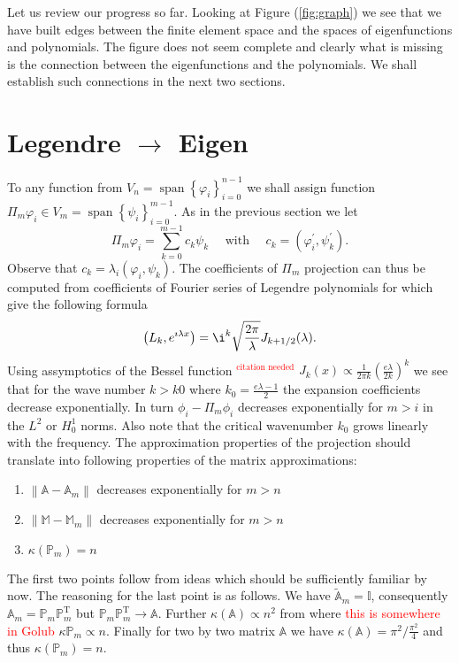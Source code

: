 \documentclass[a4paper,10pt]{article}
\newcommand{\norm}[1]{\ensuremath{\left\|#1\right\|}}
\newcommand{\inner}[2]{\ensuremath{\left(#1, #2\right)}}
\newcommand{\Amat}{\ensuremath{\mathbb{A}}}
\newcommand{\Mmat}{\ensuremath{\mathbb{M}}}
\newcommand{\Ammatt}{\ensuremath{\tilde{\mathbb{A}}_m}}              %
\newcommand{\Ammat}{\ensuremath{\mathbb{A}_m}}               %
\newcommand{\Mmmat}{\ensuremath{\mathbb{M}_m}}               %
\newcommand{\Pmat}{\ensuremath{\mathbb{P}_m}}                  %
\newcommand{\Pmatt}{\ensuremath{\mathbb{P}_m^{\text{T}}}}       %
\newcommand{\TODO}[1]{\textcolor{red}{#1}}
\DeclareMathOperator{\spn}{span}
\begin{document}
  Let us review our progress so far. Looking at Figure (\ref{fig:graph}) we
  see that we have built edges between the finite element space 
  and the spaces of eigenfunctions and polynomials. The figure does not seem
  complete and clearly what is missing is the connection between the
  eigenfunctions and the polynomials. We shall establish such connections in the
  next two sections.

  \section{Legendre $\rightarrow$ Eigen}
  To any function from $V_n=\spn\left\{\varphi_i\right\}_{i=0}^{n-1}$ we shall
  assign function $\Pi_m\varphi_i\in V_m=\spn\left\{\psi_i\right\}_{i=0}^{m-1}$.
  As in the previous section we let
  \[
    \Pi_m\varphi_i=\displaystyle\sum\limits_{k=0}^{m-1}c_k\psi_k
    \quad\text{ with }\quad
    c_k = \inner{\varphi^{\prime}_i}{\psi^{\prime}_k}.
  \]
  Observe that $c_k=\lambda_i\inner{\varphi_i}{\psi_k}$. The coefficients
  of $\Pi_m$ projection can thus be computed from coefficients of Fourier
  series of Legendre polynomials for which \cite{arxiv} give the following
  formula
  \[
    \inner
    {L_k}{e^{\imath\lambda x}}=\i^k\sqrt{\frac{2\pi}{\lambda}}J_{k+1/2}(\lambda).
  \]
  Using assymptotics of the Bessel function \TODO{$^{\text{citation needed}}$}
  $J_k(x)\propto\frac{1}{2\pi k}\left(\frac{e\lambda}{2k}\right)^{k}$ we see
  that for the wave number $k>k0$ where $k_0=\frac{e\lambda-1}{2}$ the expansion
  coefficients decrease exponentially. In turn $\phi_i - \Pi_m\phi_i$ decreases
  exponentially for $m>i$ in the $L^2$ or $H^1_0$ norms. Also note that
  the critical wavenumber $k_0$ grows linearly with the frequency. The
  approximation properties of the projection should translate into following
  properties of the matrix approximations:
  \begin{enumerate}
    \item $\norm{\Amat - \Ammat}$ decreases exponentially for $m>n$
    \item $\norm{\Mmat - \Mmmat}$ decreases exponentially for $m>n$
    \item $\kappa(\Pmat)=n$ 
  \end{enumerate}
  The first two points follow from ideas which should be sufficiently familiar
  by now. The reasoning for the last point is as follows. We have
  $\Ammatt=\mathbb{I}$, consequently $\Ammat=\Pmat\Pmatt$ but
  $\Pmat\Pmatt\rightarrow\Amat$. Further $\kappa(\Amat)\propto n^2$ from where
  \TODO{this is somewhere in Golub} $\kappa{\Pmat}\propto n$. Finally for two
  by two matrix $\Amat$ we have $\kappa(\Amat)=\pi^2/\frac{\pi^2}{4}$ and thus
  $\kappa(\Pmat)=n$.
\end{document}
